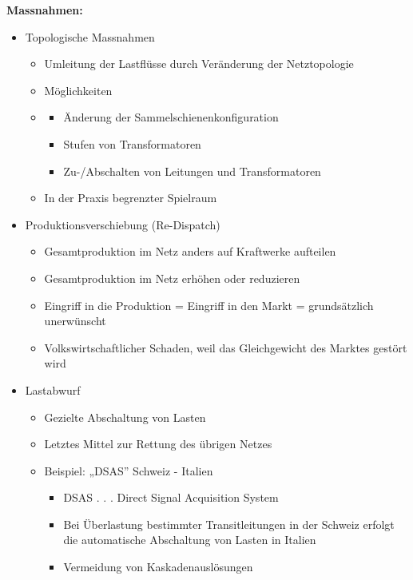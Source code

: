 \textbf{Massnahmen:}
\begin{itemize}
    \item Topologische Massnahmen
    \begin{itemize}
        \item Umleitung der Lastflüsse durch Veränderung der Netztopologie
        \item Möglichkeiten
        \item \begin{itemize}
            \item Änderung der Sammelschienenkonfiguration
            \item Stufen von Transformatoren
            \item Zu-/Abschalten von Leitungen und Transformatoren
        \end{itemize}
        \item In der Praxis begrenzter Spielraum
    \end{itemize}
    \item Produktionsverschiebung (Re-Dispatch)
    \begin{itemize}
        \item Gesamtproduktion im Netz anders auf Kraftwerke aufteilen
        \item Gesamtproduktion im Netz erhöhen oder reduzieren
        \item Eingriff in die Produktion = Eingriff in den Markt = grundsätzlich unerwünscht
        \item Volkswirtschaftlicher Schaden, weil das Gleichgewicht des Marktes gestört wird
    \end{itemize}
    \item Lastabwurf
    \begin{itemize}
        \item Gezielte Abschaltung von Lasten
        \item Letztes Mittel zur Rettung des übrigen Netzes
        \item Beispiel: „DSAS” Schweiz - Italien
        \begin{itemize}
            \item DSAS . . . Direct Signal Acquisition System
            \item Bei Überlastung bestimmter Transitleitungen in der Schweiz erfolgt die automatische Abschaltung von Lasten in Italien
            \item Vermeidung von Kaskadenauslösungen
        \end{itemize}
    \end{itemize}
\end{itemize}